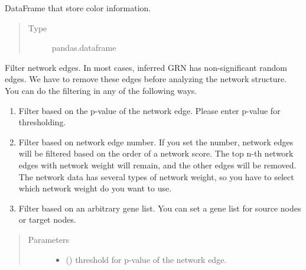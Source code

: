 \documentclass[letterpaper,10pt,english]{sphinxmanual}
\begin{document}
\begin{fulllineitems}

\begin{fulllineitems}
\label{\detokenize{modules/celloracle:celloracle.Links.palette}}
DataFrame that store color information.
\begin{quote}\begin{description}
\item[{Type}] \leavevmode
pandas.dataframe

\end{description}\end{quote}

\end{fulllineitems}


\begin{fulllineitems}
\label{\detokenize{modules/celloracle:celloracle.Links.filter_links}}
Filter network edges.
In most cases, inferred GRN has non-significant random edges.
We have to remove these edges before analyzing the network structure.
You can do the filtering in any of the following ways.
\begin{enumerate}
\def\theenumi{\arabic{enumi}}
\def\labelenumi{(\theenumi )}
\makeatletter\def\p@enumii{\p@enumi (\theenumi )}\makeatother
\item {} 
Filter based on the p-value of the network edge.
Please enter p-value for thresholding.

\item {} 
Filter based on network edge number.
If you set the number, network edges will be filtered based on the order of a network score. The top n-th network edges with network weight will remain, and the other edges will be removed.
The network data has several types of network weight, so you have to select which network weight do you want to use.

\item {} 
Filter based on an arbitrary gene list. You can set a gene list for source nodes or target nodes.

\end{enumerate}
\begin{quote}\begin{description}
\item[{Parameters}] \leavevmode\begin{itemize}
\item {} 
 () \textendash{} threshold for p-value of the network edge.


\end{itemize}
\end{description}
\end{quote}
\end{fulllineitems}
\end{fulllineitems}
\end{document}
